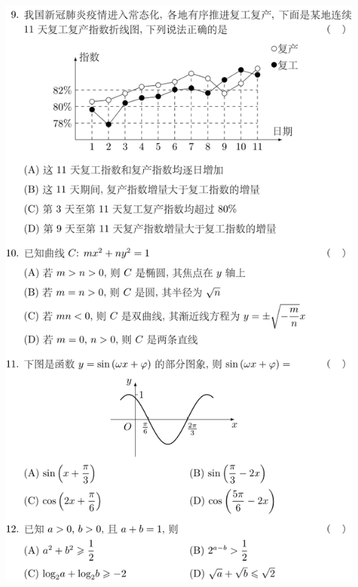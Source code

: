 \documentclass[11pt,a4paper]{ctexart}
\begin{document}
\begin{paracol}{2}
\includegraphics[width=\linewidth]{figure04.png}
\newpage




\small
\switchcolumn

\newpage
{}
\newpage
{}
\newpage
{}
\newpage

\end{paracol}
\end{document}
